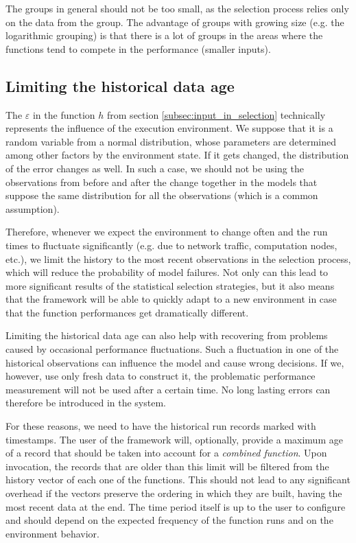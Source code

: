 The groups in general should not be too small, as the selection process relies only on the data from the group. The advantage of groups with growing size (e.g. the logarithmic grouping) is that there is a lot of groups in the areas where the functions tend to compete in the performance (smaller inputs).

\subsection{Limiting the historical data age}
\label{subsec:limiting_record_age}

The $\varepsilon$ in the function $h$ from section \ref{subsec:input_in_selection} technically represents the influence of the execution environment. We suppose that it is a random variable from a normal distribution, whose parameters are determined among other factors by the environment state. If it gets changed, the distribution of the error changes as well. In such a case, we should not be using the observations from before and after the change together in the models that suppose the same distribution for all the observations (which is a common assumption).

Therefore, whenever we expect the environment to change often and the run times to fluctuate significantly (e.g. due to network traffic, computation nodes, etc.), we limit the history to the most recent observations in the selection process, which will reduce the probability of model failures. Not only can this lead to more significant results of the statistical selection strategies, but it also means that the framework will be able to quickly adapt to a new environment in case that the function performances get dramatically different.

Limiting the historical data age can also help with recovering from problems caused by occasional performance fluctuations. Such a fluctuation in one of the historical observations can influence the model and cause wrong decisions. If we, however, use only fresh data to construct it, the problematic performance measurement will not be used after a certain time. No long lasting errors can therefore be introduced in the system.

For these reasons, we need to have the historical run records marked with timestamps. The user of the framework will, optionally, provide a maximum age of a record that should be taken into account for a \textit{combined function}. Upon invocation, the records that are older than this limit will be filtered from the history vector of each one of the functions. This should not lead to any significant overhead if the vectors preserve the ordering in which they are built, having the most recent data at the end. The time period itself is up to the user to configure and should depend on the expected frequency of the function runs and on the environment behavior.


